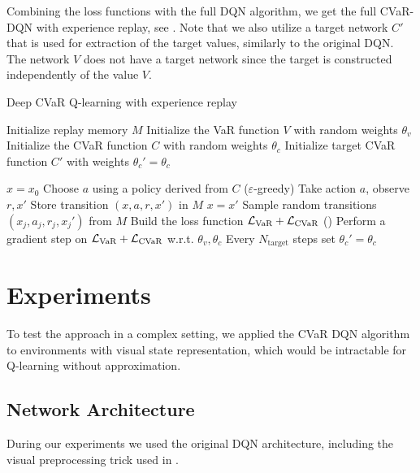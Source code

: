 Combining the loss functions with the full DQN algorithm, we get the full CVaR-DQN with experience replay, see . Note that we also utilize a target network $C'$ that is used for extraction of the target values, similarly to the original DQN. The network $V$ does not have a target network since the target is constructed independently of the value $V$.
\begin{algorithm}
\caption{Deep CVaR Q-learning with experience replay}
\begin{algorithmic}\label{alg:cvardqn}

    \STATE Initialize replay memory $M$
    \STATE Initialize the VaR function $V$ with random weights $\theta_v$
    \STATE Initialize the CVaR function $C$ with random weights $\theta_c$
    \STATE Initialize target CVaR function $C'$ with weights $\theta_c'=\theta_c$

    \STATE $x=x_0$
	\STATE Choose $a$ using a policy derived from $C$ ($\varepsilon$-greedy)
	\STATE Take action $a$, observe $r, x'$
	\STATE Store transition $(x, a, r, x')$ in $M$
	\STATE $x = x'$
	\STATE Sample random transitions $(x_j, a_j, r_j, x_j')$ from $M$
	\STATE Build the loss function $\mathcal{L}_{\text{VaR}} + \mathcal{L}_{\text{CVaR}}$ ()
    \STATE Perform a gradient step on $\mathcal{L}_{\text{VaR}} + \mathcal{L}_{\text{CVaR}}$ w.r.t. $\theta_v, \theta_c$
    \STATE Every $N_\text{target}$ steps set $\theta_c'=\theta_c$
	\ENDWHILE
	\ENDFOR
	
\end{algorithmic}
\end{algorithm}

\newpage

\section{Experiments}

To test the approach in a complex setting, we applied the CVaR DQN algorithm to environments with visual state representation, which would be intractable for Q-learning without approximation. 

\subsection{Network Architecture}
During our experiments we used the original DQN architecture, including the visual preprocessing trick used in \citet{mnih2015human}.

